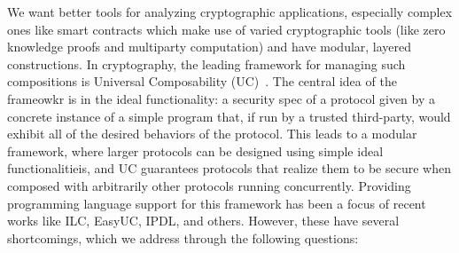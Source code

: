 We want better tools for analyzing cryptographic applications, especially complex ones like smart contracts which make use of varied cryptographic tools (like zero knowledge proofs and multiparty computation) and have modular, layered constructions.
In cryptography, the leading framework for managing such compositions is Universal Composability (UC)~\cite{uc}.
The central idea of the frameowkr is in the ideal functionality: a security spec of a protocol given by a concrete instance of a simple program that, if run by a trusted third-party, would exhibit all of the desired behaviors of the protocol.
This leads to a modular framework, where larger protocols can be designed using simple ideal functionalitieis, and UC guarantees protocols that realize them to be secure when composed with arbitrarily other protocols running concurrently.
Providing programming language support for this framework has been a focus of recent works like ILC, EasyUC, IPDL, and others. However, these have several shortcomings, which we address through the following questions:

